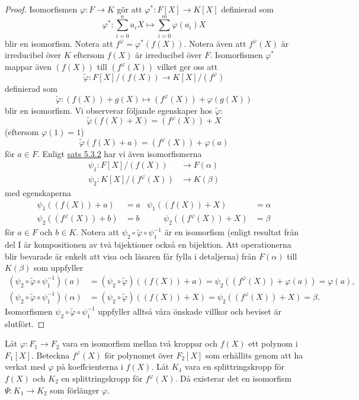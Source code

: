 \documentclass{article}
\theoremstyle{definition}
\begin{document}
\begin{proof}
  Isomorfismen $\varphi: F \rightarrow K$ gör att $\varphi^*: F[X] \rightarrow K[X]$ definierad som 
  \[\varphi^*: \sum_{i = 0}^n a_iX \mapsto \sum_{i = 0}^m \varphi(a_i)X\]
  blir en isomorfism. Notera att $f^{\varphi} = \varphi^*(f(X)).$ Notera även att $f^{\varphi}(X)$ är irreducibel över $K$ eftersom $f(X)$ är irreducibel över $F$.
  Isomorfismen $\varphi^*$ mappar även $(f(X))$ till $(f^{\varphi}(X))$ vilket ger oss att
  \[\tilde{\varphi}: F[X]/(f(X)) \rightarrow K[X]/(f^{\varphi})\]
  definierad som 
  \[\tilde{\varphi}: (f(X)) + g(X) \mapsto (f^{\varphi}(X)) + \varphi(g(X))\]
  blir en isomorfism. Vi observerar följande egenskaper hos $\tilde{\varphi}$:
  \[\tilde{\varphi}(f(X) + X) = (f^{\varphi}(X)) + X\]
  (eftersom $\varphi(1) = 1$)
  \[\tilde{\varphi}(f(X) + a) = (f^{\varphi}(X)) + \varphi(a)\]
  för $a \in F$. Enligt \hyperlink{5.3.2}{sats 5.3.2} har vi även isomorfismerna 
  \begin{align*}
    \psi_1: F[X]/(f(X)) &\rightarrow F(\alpha) \\
    \psi_2: K[X]/(f^{\varphi}(X)) &\rightarrow K(\beta)
  \end{align*}
  med egenskaperna
  \begin{align*}
    \psi_1((f(X)) + a) &= a           & \psi_1((f(X)) + X) &= \alpha \\
    \psi_2((f^{\varphi}(X)) + b) &= b & \qquad \psi_2((f^{\varphi}(X)) + X) &= \beta
  \end{align*}
  för $a \in F$ och $b \in K.$ Notera att $\psi_2 \circ \tilde{\varphi} \circ \psi_1^{-1}$ är en isomorfism (enligt resultat från del I är 
  kompositionen av två bijektioner också en bijektion. Att operationerna blir bevarade är enkelt att visa och läsaren får fylla i detaljerna)
  från $F(\alpha)$ till $K(\beta)$ som uppfyller 
  \begin{align*}
    (\psi_2 \circ \tilde{\varphi} \circ \psi_1^{-1}) (a) &= (\psi_2 \circ \tilde{\varphi}) ( (f(X)) + a) = \psi_2 ((f^{\varphi}(X)) + \varphi(a)) = \varphi(a), \\
    (\psi_2 \circ \tilde{\varphi} \circ \psi_1^{-1}) (\alpha) &= (\psi_2 \circ \tilde{\varphi}) ((f(X)) + X) = \psi_2((f^{\varphi}(X)) + X) = \beta.
  \end{align*}
  Isomorfismen $\psi_2 \circ \tilde{\varphi} \circ \psi_1^{-1}$ uppfyller alltså våra önskade villkor och beviset är slutfört.
\end{proof}

\hypertarget{sats6.0.1}{}
\begin{mytheo}{}{}
  Låt $\varphi: F_1 \rightarrow F_2$ vara en isomorfism mellan två kroppar och $f(X)$ ett polynom i $F_1[X]$. Beteckna 
  $f^{\varphi}(X)$ för polynomet över $F_2[X]$ som erhållits genom att ha verkat med $\varphi$ på koeffcienterna i $f(X)$. Låt 
  $K_1$ vara en splittringskropp för $f(X)$ och $K_2$ en splittringskropp för $f^{\varphi}(X).$ Då existerar det en isomorfism $\Psi: K_1 \rightarrow K_2$
  som förlänger $\varphi.$
\end{mytheo}
\end{document}

